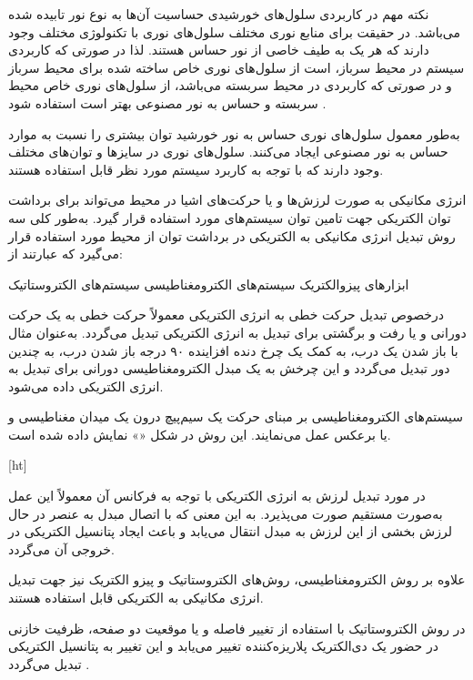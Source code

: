 نکته مهم در کاربردی سلول‌های خورشیدی حساسیت آن‌ها به نوع نور تابیده شده می‌باشد. در حقیقت برای منابع نوری مختلف سلول‌های نوری با تکنولوژی مختلف وجود دارند که هر یک به طیف خاصی از نور حساس هستند. لذا در صورتی که کاربردی سیستم در محیط سرباز، است از سلول‌های نوری خاص ساخته شده برای محیط سرباز و در صورتی که کاربردی در محیط سربسته می‌باشد، از سلول‌های نوری خاص محیط سربسته و حساس به نور مصنوعی بهتر است استفاده شود .

به‌طور معمول سلول‌های نوری حساس به نور خورشید توان بیشتری را نسبت به موارد حساس به نور مصنوعی ایجاد می‌کنند. سلول‌های نوری در سایزها و توان‌های مختلف وجود دارند که با توجه به کاربرد سیستم  مورد نظر قابل استفاده هستند.




انرژی مکانیکی به صورت لرزش‌ها و یا حرکت‌های اشیا در محیط می‌تواند برای برداشت توان الکتریکی جهت تامین توان سیستم‌های  مورد استفاده قرار گیرد. به‌طور کلی سه روش تبدیل انرژی مکانیکی به الکتریکی در برداشت توان از محیط مورد استفاده قرار می‌گیرد که عبارتند از:


 ابزارهای پیزوالکتریک
 سیستم‌های الکترومغناطیسی
 سیستم‌های الکتروستاتیک


درخصوص تبدیل حرکت خطی به انرژی الکتریکی معمولاً حرکت خطی به یک حرکت دورانی و یا رفت و برگشتی برای تبدیل به انرژی الکتریکی تبدیل می‌گردد. به‌عنوان مثال با باز شدن یک درب، به کمک یک چرخ دنده افزاینده ۹۰ درجه باز شدن درب، به چندین دور تبدیل می‌گردد و این چرخش به یک مبدل الکترومغناطیسی دورانی برای تبدیل به انرژی الکتریکی داده می‌شود.

سیستم‌های الکترومغناطیسی بر مبنای حرکت یک سیم‌پیچ درون یک میدان مغناطیسی و یا برعکس عمل می‌نمایند. این روش در شکل «» نمایش داده شده است.

[ht]



در مورد تبدیل لرزش به انرژی الکتریکی با توجه به فرکانس آن معمولاً این عمل به‌صورت مستقیم صورت می‌پذیرد. به این معنی که با اتصال مبدل به عنصر در حال لرزش بخشی از این لرزش به مبدل انتقال می‌یابد و باعث ایجاد پتانسیل الکتریکی در خروجی آن می‌گردد.

علاوه بر روش الکترومغناطیسی، روش‌های الکتروستاتیک و پیزو الکتریک نیز جهت تبدیل انرژی مکانیکی به الکتریکی قابل استفاده هستند.

در روش الکتروستاتیک با استفاده از تغییر فاصله و یا موقعیت دو صفحه، ظرفیت خازنی در حضور یک دی‌الکتریک پلاریزه‌کننده تغییر می‌یابد و این تغییر به پتانسیل الکتریکی تبدیل می‌گردد .

